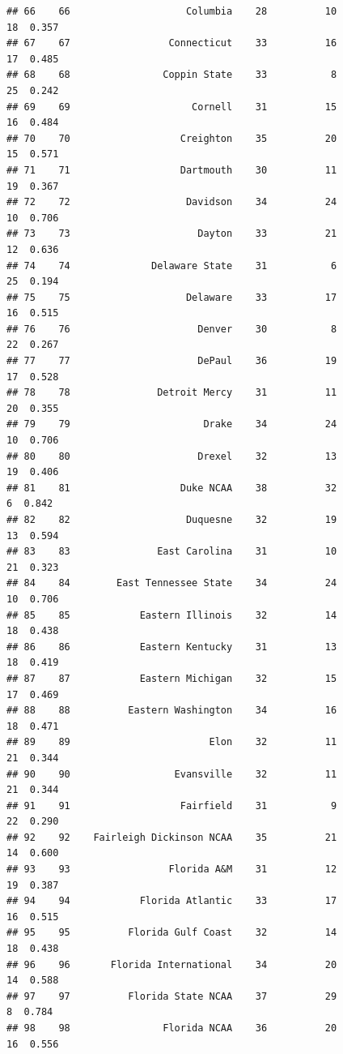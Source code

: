 \documentclass[]{book}
\begin{document}
\begin{verbatim}
## 66    66                    Columbia    28          10            18  0.357
## 67    67                 Connecticut    33          16            17  0.485
## 68    68                Coppin State    33           8            25  0.242
## 69    69                     Cornell    31          15            16  0.484
## 70    70                   Creighton    35          20            15  0.571
## 71    71                   Dartmouth    30          11            19  0.367
## 72    72                    Davidson    34          24            10  0.706
## 73    73                      Dayton    33          21            12  0.636
## 74    74              Delaware State    31           6            25  0.194
## 75    75                    Delaware    33          17            16  0.515
## 76    76                      Denver    30           8            22  0.267
## 77    77                      DePaul    36          19            17  0.528
## 78    78               Detroit Mercy    31          11            20  0.355
## 79    79                       Drake    34          24            10  0.706
## 80    80                      Drexel    32          13            19  0.406
## 81    81                   Duke NCAA    38          32             6  0.842
## 82    82                    Duquesne    32          19            13  0.594
## 83    83               East Carolina    31          10            21  0.323
## 84    84        East Tennessee State    34          24            10  0.706
## 85    85            Eastern Illinois    32          14            18  0.438
## 86    86            Eastern Kentucky    31          13            18  0.419
## 87    87            Eastern Michigan    32          15            17  0.469
## 88    88          Eastern Washington    34          16            18  0.471
## 89    89                        Elon    32          11            21  0.344
## 90    90                  Evansville    32          11            21  0.344
## 91    91                   Fairfield    31           9            22  0.290
## 92    92    Fairleigh Dickinson NCAA    35          21            14  0.600
## 93    93                 Florida A&M    31          12            19  0.387
## 94    94            Florida Atlantic    33          17            16  0.515
## 95    95          Florida Gulf Coast    32          14            18  0.438
## 96    96       Florida International    34          20            14  0.588
## 97    97          Florida State NCAA    37          29             8  0.784
## 98    98                Florida NCAA    36          20            16  0.556

\end{verbatim}
\end{document}
